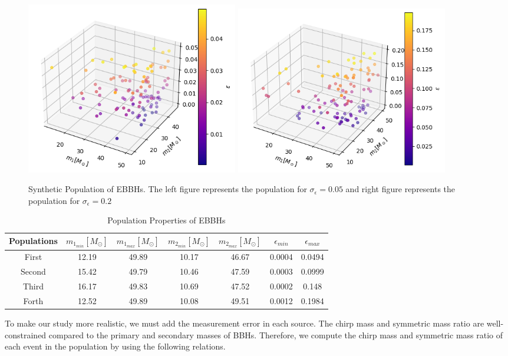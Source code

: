 \documentclass[twocolumn,prd,nofootinbib]{revtex4}
\begin{document}
\begin{figure}[]
\includegraphics[width=0.45\textwidth]{paper/figures/pop3d_0.05.png}
\includegraphics[width=0.45\textwidth]{paper/figures/pop3d_0.2.png}
\caption{\label{fig:pop3d0.05_0.2} Synthetic Population of EBBHs. The left figure represents the population for $\sigma_\epsilon=0.05$ and right figure represents the population for $\sigma_\epsilon=0.2$}
\end{figure}


\begin{table}[]
    \centering
    \begin{tabular}{c|cccccc}
        \hline \hline
        Populations & $m_{1_{min}} [M_\odot] $ & $m_{1_{max}} [M_\odot]$ & $m_{2_{min}} [M_\odot]$ & $m_{2_{max}} [M_\odot]$ & $\epsilon_{min}$ & $\epsilon_{max}$\\ \hline
        First  & 12.19 & 49.89 & 10.17 & 46.67 & 0.0004 & 0.0494\\ \hline
        Second  & 15.42 & 49.79 & 10.46 & 47.59 & 0.0003 & 0.0999\\ \hline
        Third  & 16.17 & 49.83 & 10.69 & 47.52 & 0.0002 & 0.148\\ \hline
        Forth  & 12.52 & 49.89 & 10.08 & 49.51 & 0.0012 & 0.1984\\ \hline
    \end{tabular}
    \caption{Population Properties of EBBHs}
    \label{tab:pop_prop}
\end{table}
To make our study more realistic, we must add the measurement error in each source. The chirp mass and symmetric mass ratio are well-constrained compared to the primary and secondary masses of BBHs. Therefore, we compute the chirp mass and symmetric mass ratio of each event in the population by using the following relations.
\end{document}
